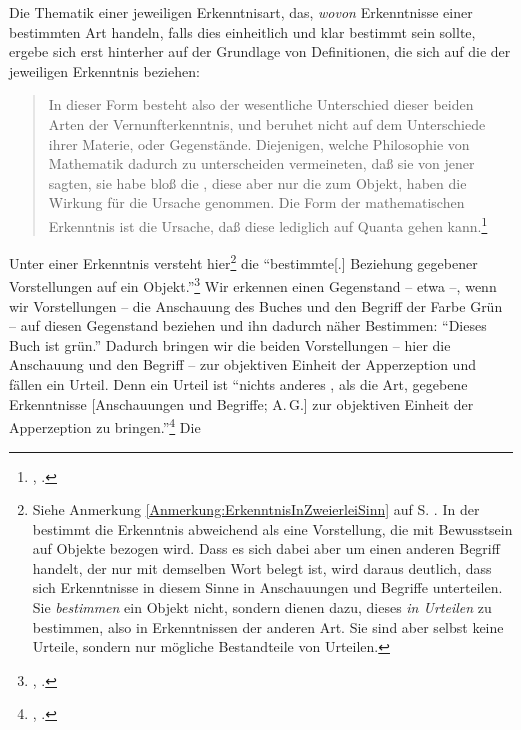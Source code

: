 Die Thematik einer jeweiligen Erkenntnisart, das, \emph{wovon} Erkenntnisse
einer bestimmten Art handeln, falls dies einheitlich und klar bestimmt sein
sollte, ergebe sich erst hinterher auf der Grundlage von Definitionen, die sich
auf die  der jeweiligen Erkenntnis beziehen:
\begin{quote}
In dieser Form besteht also der wesentliche Unterschied dieser beiden Arten der
Vernunfterkenntnis, und beruhet nicht auf dem Unterschiede ihrer Materie, oder
Gegenstände. Diejenigen, welche Philosophie von Mathematik dadurch zu
unterscheiden vermeineten, daß sie von jener sagten, sie habe bloß die
, diese aber nur die  zum Objekt, haben die Wirkung
für die Ursache genommen. Die Form der mathematischen Erkenntnis ist die
Ursache, daß diese lediglich auf Quanta gehen
kann.\footnote{\cite[][B 742]{Kant:KritikderreinenVernunft2003},
\cite[][III: 469.34--470.4]{Kant:GesammelteWerke1900ff.}.}
\end{quote}
Unter einer Erkenntnis versteht  hier\footnote{Siehe
Anmerkung \ref{Anmerkung:ErkenntnisInZweierleiSinn} auf S.
\pageref{Anmerkung:ErkenntnisInZweierleiSinn}. In der 
bestimmt  die Erkenntnis abweichend als eine Vorstellung,
die mit Bewusstsein auf Objekte bezogen wird.
Dass es sich dabei aber um einen anderen Begriff handelt, der nur mit demselben
Wort belegt ist, wird daraus deutlich, dass sich Erkenntnisse in diesem Sinne in
Anschauungen und Begriffe unterteilen. Sie \emph{bestimmen} ein Objekt nicht,
sondern dienen dazu, dieses \emph{in Urteilen} zu bestimmen, also in
Erkenntnissen der anderen Art. Sie sind aber selbst keine Urteile, sondern nur
mögliche Bestandteile von Urteilen.} die \enquote{bestimmte[.] Beziehung
gegebener Vorstellungen auf ein Objekt.}\footnote{\cite[][B
137]{Kant:KritikderreinenVernunft2003}, \cite[][III:
111.17--18]{Kant:GesammelteWerke1900ff.}.} Wir erkennen einen Gegenstand -- etwa
 --, wenn wir Vorstellungen -- die Anschauung des
Buches und den Begriff der Farbe Grün -- auf diesen Gegenstand beziehen und ihn
dadurch näher Bestimmen: \enquote{Dieses Buch ist grün.} Dadurch bringen wir die
beiden Vorstellungen -- hier die Anschauung und den Begriff -- zur objektiven
Einheit der Apperzeption und fällen ein Urteil. Denn ein Urteil ist
\enquote{nichts anderes {\punkt}, als die Art, gegebene Erkenntnisse
[Anschauungen und Begriffe; A.\,G.] zur objektiven Einheit der Apperzeption zu
bringen.}\footnote{\cite[][B 141]{Kant:KritikderreinenVernunft2003},
\cite[][III: 114.7--8]{Kant:GesammelteWerke1900ff.}.} Die 
